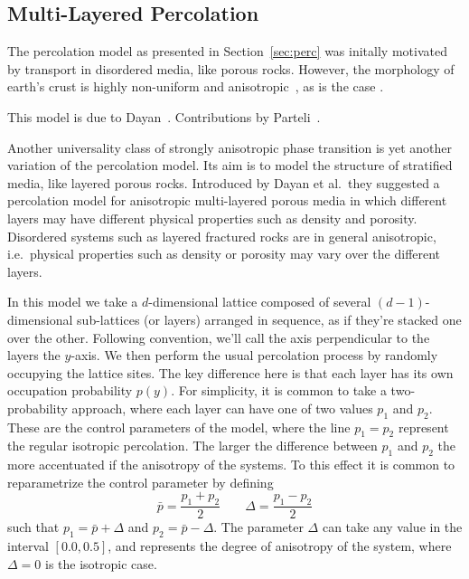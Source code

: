 \subsection{Multi-Layered Percolation}
\label{sec:mlp}

The percolation model as presented in Section~\ref{sec:perc} was initally
motivated by transport in disordered media, like porous rocks. However, the
morphology of earth's crust is highly non-uniform and
anisotropic~\cite{Englman1986}, as is the case .


This model is due to Dayan~\cite{Dayan1991}.
Contributions by Parteli~\cite{Parteli2010}.

Another universality class of strongly anisotropic phase transition is yet
another variation of the percolation model. Its aim is to model the structure
of stratified media, like layered porous rocks. Introduced by Dayan et al.\,
they suggested a percolation model for anisotropic multi-layered porous media
in which different layers may have different physical properties such as
density and porosity. Disordered systems such as layered fractured rocks are in
general anisotropic, i.e.\ physical properties such as density or porosity may
vary over the different layers.

In this model we take a $d$-dimensional lattice composed of several
$(d-1)$-dimensional sub-lattices (or layers) arranged in sequence, as if
they're stacked one over the other. Following convention, we'll call the axis
perpendicular to the layers the $y$-axis. We then perform the usual percolation
process by randomly occupying the lattice sites. The key difference here is
that each layer has its own occupation probability $p(y)$.
For simplicity, it is common to take a two-probability approach, where
each layer can have one of two values $p_1$ and $p_2$. These are
the control parameters of the model, where the line $p_1=p_2$ represent
the regular isotropic percolation. The larger the difference between
$p_1$ and $p_2$ the more accentuated if the anisotropy of the systems.
To this effect it is common to reparametrize the control parameter
by defining
\begin{equation}
    \bar{p}=\frac{p_1 + p_2}{2}\;\;\;\;\;\;\;\Delta=\frac{p_1 - p_2}{2}
\end{equation}
such that $p_1 = \bar{p} + \Delta$ and $p_2 = \bar{p} - \Delta$. 
The parameter $\Delta$ can take any value in the interval $[0.0,0.5]$,
and represents the degree of anisotropy of the system, where $\Delta=0$
is the isotropic case.

